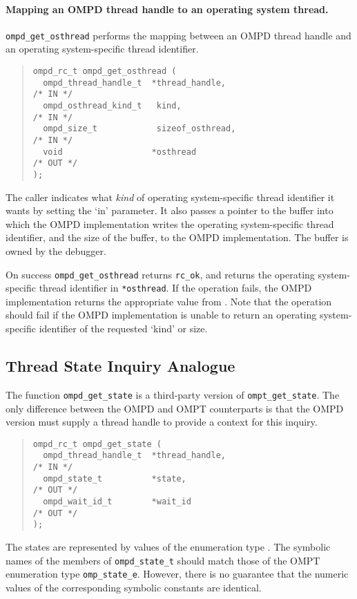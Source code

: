 \paragraph{Mapping an OMPD thread handle to an operating system thread.}
\verb|ompd_get_osthread| performs the mapping between an OMPD
thread handle and an operating system-specific thread identifier.
\begin{quote}
\begin{lstlisting}
ompd_rc_t ompd_get_osthread (
  ompd_thread_handle_t  *thread_handle,                             /* IN */
  ompd_osthread_kind_t   kind,                                      /* IN */
  ompd_size_t            sizeof_osthread,                           /* IN */
  void                  *osthread                                  /* OUT */
);
\end{lstlisting}
\end{quote}

The caller indicates what \emph{kind} of operating system-specific thread
identifier it wants by setting the 
`in' parameter.
It also passes a pointer to the buffer into which the OMPD
implementation writes the operating system-specific thread identifier,
and the size of the buffer, to the OMPD implementation.
The buffer is owned by the debugger.

On success \texttt{ompd\_get\_osthread} returns \texttt{rc\_ok},
and returns the operating system-specific thread identifier in
\texttt{*osthread}.
If the operation fails, the OMPD implementation returns
the appropriate value from .
Note that the operation should fail if the OMPD implementation is
unable to return an operating system-specific identifier of the
requested `kind' or size.


\subsection{Thread State Inquiry Analogue}

The function \verb|ompd_get_state| is a  third-party version of
\verb|ompt_get_state|. 
The only difference between the OMPD and OMPT counterparts
is that the OMPD version must supply a thread handle to provide
a context for this inquiry.

\begin{quote}
\begin{lstlisting}
ompd_rc_t ompd_get_state (
  ompd_thread_handle_t  *thread_handle,                             /* IN */
  ompd_state_t          *state,                                    /* OUT */
  ompd_wait_id_t        *wait_id                                   /* OUT */
);
\end{lstlisting}
\end{quote}

The states are represented by values of the enumeration type
.
The symbolic names of the members of \texttt{ompd\_state\_t} should
match those of the OMPT enumeration type \texttt{omp\_state\_e}.
However, there is no guarantee that the numeric values of the corresponding
symbolic constants are identical.
